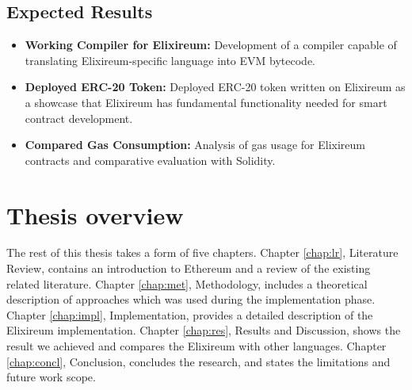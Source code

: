 \subsection{Expected Results}
\begin{itemize}
  \item \textbf{Working Compiler for Elixireum:} Development of a compiler capable of translating Elixireum-specific language into EVM bytecode.
  
  \item \textbf{Deployed ERC-20 Token:} Deployed ERC-20 token written on Elixireum as a showcase that Elixireum has fundamental functionality needed for smart contract development.
  
  \item \textbf{Compared Gas Consumption:} Analysis of gas usage for Elixireum contracts and comparative evaluation with Solidity.
\end{itemize}

\section{Thesis overview}
\label{sec:thesoverview}

The rest of this thesis takes a form of five chapters. Chapter \ref{chap:lr}, Literature Review, contains an introduction to Ethereum and a review of the existing related literature. Chapter \ref{chap:met}, Methodology, includes a theoretical description of approaches which was used during the implementation phase. Chapter \ref{chap:impl}, Implementation, provides a detailed description of the Elixireum implementation. Chapter \ref{chap:res}, Results and Discussion, shows the result we achieved and compares the Elixireum with other languages. Chapter \ref{chap:concl}, Conclusion, concludes the research, and states the limitations and future work scope.
